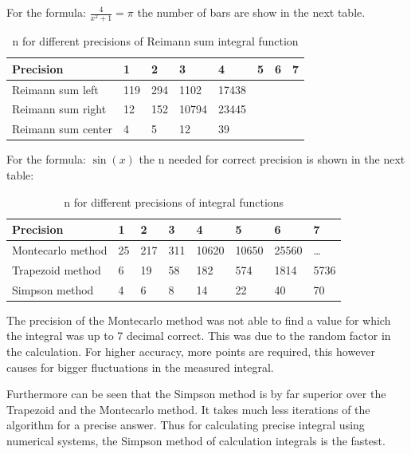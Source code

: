 \documentclass[a4paper,12px]{article}
\begin{document}
For the formula: $\frac{4}{x^2 + 1} = \pi$ the number of bars are show in the
next table.

\begin{table}[H]
    \begin{tabular}{llllllll}
        \hline
        Precision          & 1   & 2   & 3     & 4     & 5 & 6 & 7 \\
        \hline
        Reimann sum left   & 119 & 294 & 1102  & 17438 &   &   & \\
        Reimann sum right  & 12  & 152 & 10794 & 23445 &   &   & \\
        Reimann sum center & 4   & 5   & 12    & 39    &   &   & \\
        \hline
    \end{tabular}
    \caption{n for different precisions of Reimann sum integral function}
\end{table}

For the formula: $\sin(x)$ the n needed for correct precision is shown in the
next table:

\begin{table}[H]
    \begin{tabular}{llllllll}
        \hline
        Precision          & 1  & 2   & 3   & 4     & 5     & 6     & 7 \\
        \hline
        Montecarlo method  & 25 & 217 & 311 & 10620 & 10650 & 25560 & \dots  \\
        Trapezoid  method  & 6  & 19  & 58  & 182   & 574   & 1814  & 5736\\
        Simpson method     & 4  & 6   & 8   & 14    & 22    & 40    & 70\\
        \hline
    \end{tabular}
    \caption{n for different precisions of integral functions}
\end{table}

The precision of the Montecarlo method was not able to find a value for which
the integral was up to 7 decimal correct. This was due to the random factor in
the calculation. For higher accuracy, more points are required, this however
causes for bigger fluctuations in the measured integral.

Furthermore can be seen that the Simpson method is by far superior over the
Trapezoid and the Montecarlo method. It takes much less iterations of the
algorithm for a precise answer. Thus for calculating precise integral using
numerical systems, the Simpson method of calculation integrals is the fastest.




%
%
\end{document}
